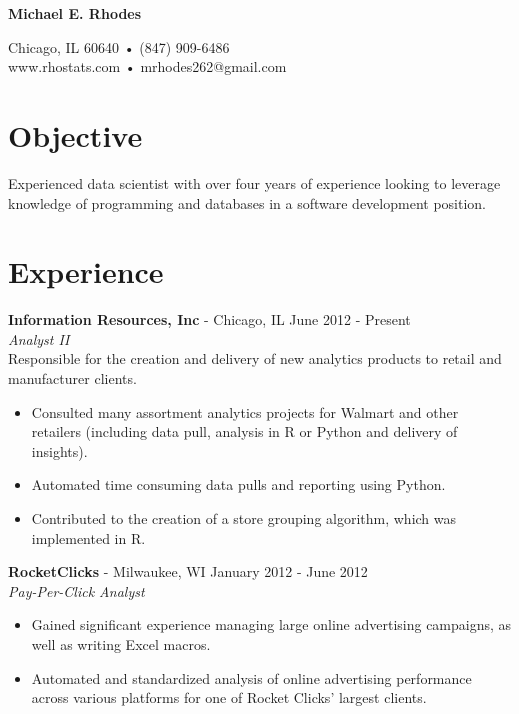 \documentclass[margin]{res}
\begin{document}
\begin{center}

\begin{large}
\textbf{Michael E. Rhodes}\\
\end{large}

Chicago, IL 60640 • (847) 909-6486\\
www.rhostats.com • mrhodes262@gmail.com \\[3pt]

\end{center}


\begin{resume}

\section{Objective} Experienced data scientist with over four years of experience looking to leverage knowledge of programming and databases in a software development position.

\section{Experience}
 {\bf Information Resources, Inc} - Chicago, IL \hfill June 2012 - Present\\
 \textit{Analyst II}\\
 {Responsible for the creation and delivery of new analytics products to retail and manufacturer clients.}
 
 \begin{itemize} \itemsep -2pt  %
	\item Consulted many assortment analytics projects for Walmart and other retailers (including data pull, analysis in R or Python and delivery of insights).
	\item Automated time consuming data pulls and reporting using Python.
 	\item Contributed to the creation of a store grouping algorithm, which was implemented in R.
 \end{itemize}
 
 {\bf RocketClicks} - Milwaukee, WI \hfill January 2012 - June 2012\\
 \textit{Pay-Per-Click Analyst}
 \begin{itemize} \itemsep -2pt
  	\item Gained significant experience managing large online advertising campaigns, as well as
writing Excel macros.
 	\item Automated and standardized analysis of online advertising performance across various
platforms for one of Rocket Clicks' largest clients.
 \end{itemize}
 

\end{resume}
\end{document}
